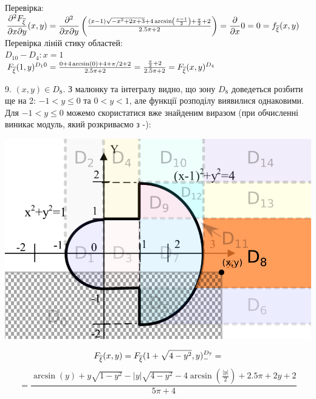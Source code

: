 \documentclass[14pt,a4paper]{scrartcl}
\theoremstyle{definition}
\theoremstyle{remark}
\theoremstyle{definition}
\theoremstyle{definition}
\begin{document}
Перевірка:\\
$\dfrac{\partial^2 F_{\overline{\xi}}}{\partial x \partial y}(x,y) =
\dfrac{\partial^2}{\partial x \partial y} \left( \frac{\left(x-1\right)\sqrt{-x^2+2x+3}+4\arcsin\left(\frac{x-1}{2}\right)+\frac{{\pi}}{2}+2}{2.5\pi + 2}
\right) = \dfrac{\partial}{ \partial x} 0 = 0=f_{\overline{\xi}} (x,y)$\\

Перевірка ліній стику областей:\\
$D_{10} - D_4 : x = 1$\\
$ F_{\overline{\xi}} (1,y)^{D_10} = \frac{0+4\arcsin(0)+4 +\pi/2 + 2}{2.5\pi + 2} = \frac{ \frac{\pi}{2} + 2  }{2.5\pi + 2}  = F_{\overline{\xi}} (x,y)^{D_4}$\\
\newpage



9. $(x,y) \in D_8$.
З малюнку та інтегралу видно, що зону $D_8$ доведеться розбити ще на 2: $-1<y \leq 0$ та $ 0< y < 1$, але функції розподілу виявилися однаковими. Для $-1<y \leq 0$ можемо скористатися вже знайденим виразом (при обчисленні виникає модуль, який розкриваємо з -):
\begin{center} \includegraphics[scale=0.34]{assets/zone945.png} \end{center}
$$
F_{\overline{\xi}} (x,y) =  F_{\overline{\xi}} (1+\sqrt{4 - y^2}, y)^{D_7}_{-} =
$$
$$
= \dfrac{\arcsin\left(y\right)+y\sqrt{1-y^2} - \left|  y \right|\sqrt{4-y^2}-4\arcsin\left(\frac{ \left|  y \right|}{2}\right) + 2.5\pi + 2y + 2}{5\pi + 4}
$$
\end{document}
